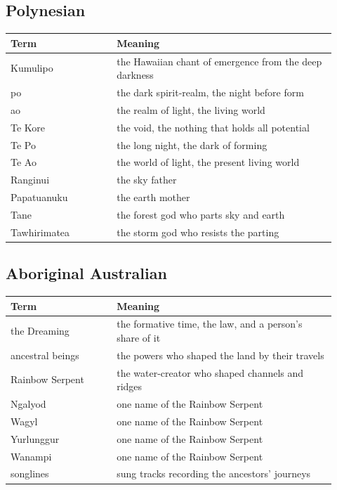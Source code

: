 \subsection{Polynesian}

\begin{longtable}{L{0.30\linewidth} L{0.62\linewidth}}
\toprule
\textbf{Term} & \textbf{Meaning} \\
\midrule
\endhead
Kumulipo & the Hawaiian chant of emergence from the deep darkness \\
po & the dark spirit-realm, the night before form \\
ao & the realm of light, the living world \\
Te Kore & the void, the nothing that holds all potential \\
Te Po & the long night, the dark of forming \\
Te Ao & the world of light, the present living world \\
Ranginui & the sky father \\
Papatuanuku & the earth mother \\
Tane & the forest god who parts sky and earth \\
Tawhirimatea & the storm god who resists the parting \\
\bottomrule
\end{longtable}

\subsection{Aboriginal Australian}

\begin{longtable}{L{0.30\linewidth} L{0.62\linewidth}}
\toprule
\textbf{Term} & \textbf{Meaning} \\
\midrule
\endhead
the Dreaming & the formative time, the law, and a person's share of it \\
ancestral beings & the powers who shaped the land by their travels \\
Rainbow Serpent & the water-creator who shaped channels and ridges \\
Ngalyod & one name of the Rainbow Serpent \\
Wagyl & one name of the Rainbow Serpent \\
Yurlunggur & one name of the Rainbow Serpent \\
Wanampi & one name of the Rainbow Serpent \\
songlines & sung tracks recording the ancestors' journeys \\
\bottomrule
\end{longtable}

